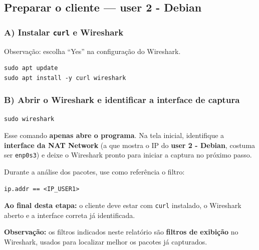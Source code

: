 \subsection{Preparar o cliente --- user 2 - Debian}

\subsubsection*{A) Instalar \texttt{curl} e Wireshark}

\begin{notebox}
Observação: escolha ``Yes'' na configuração do Wireshark.
\end{notebox}

\begin{lstlisting}
sudo apt update
sudo apt install -y curl wireshark
\end{lstlisting}


\subsubsection*{B) Abrir o Wireshark e identificar a interface de captura}

\begin{lstlisting}
sudo wireshark
\end{lstlisting}

Esse comando \textbf{apenas abre o programa}. Na tela inicial, identifique a \textbf{interface da NAT Network} (a que mostra o IP do \textbf{user 2 - Debian}, costuma ser \texttt{enp0s3}) e deixe o Wireshark pronto para iniciar a captura no próximo passo.


Durante a análise dos pacotes, use como referência o filtro:
\begin{lstlisting}
ip.addr == <IP_USER1>
\end{lstlisting}

\begin{notebox}
\textbf{Ao final desta etapa:} o cliente deve estar com \texttt{curl} instalado, o Wireshark aberto e a interface correta já identificada.

\textbf{Observação:} os filtros indicados neste relatório são \textbf{filtros de exibição} no Wireshark, usados para localizar melhor os pacotes já capturados.
\end{notebox}


